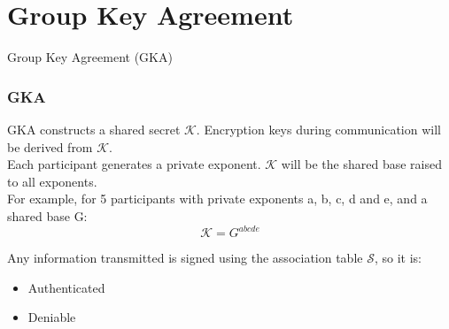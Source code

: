 \section{Group Key Agreement}

\begin{frame}
\Huge{\centerline{Group Key Agreement (GKA)}}
\end{frame}

\begin{frame}
  \frametitle{GKA}
  GKA constructs a shared secret $\mathcal{K}$. Encryption keys during communication will be derived from $\mathcal{K}$.\\[0.3cm]
  
  Each participant generates a private exponent.  $\mathcal{K}$ will be the shared base raised to all exponents.\\[0.3cm]
  
  For example, for 5 participants with private exponents a, b, c, d and e, and a shared base G:
  \[ \mathcal{K} = G^{abcde} \]

  Any information transmitted is signed using the association table $\mathcal{S}$, so it is:
  \begin{itemize}
    \item Authenticated
    \item Deniable
  \end{itemize}
  
\end{frame}

